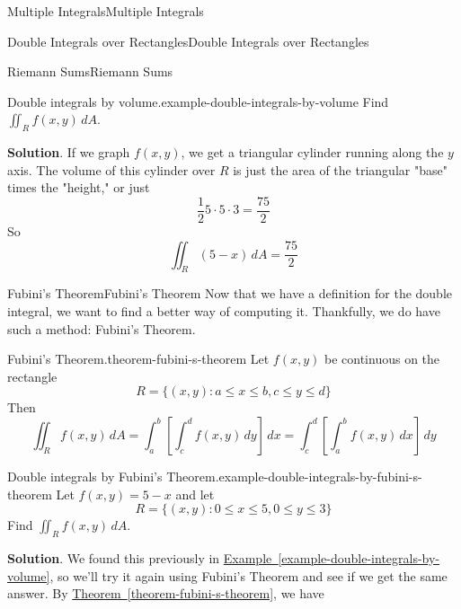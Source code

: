 \documentclass[10pt,]{book}
\numberwithin{equation}{section}
\begin{document}
\begin{chapterptx}{Multiple Integrals}{}{Multiple Integrals}{}{}
\begin{sectionptx}{Double Integrals over Rectangles}{}{Double Integrals over Rectangles}{}{}
\begin{subsectionptx}{Riemann Sums}{}{Riemann Sums}{}{}
\begin{example}{Double integrals by volume.}{example-double-integrals-by-volume}
Find \(\iint_{R}f(x,y)\,dA\).%
\par\smallskip%
\noindent\textbf{Solution}.\hypertarget{solution-196}{}\quad%
\hypertarget{p-1245}{}%
If we graph \(f(x,y)\), we get a triangular cylinder running along the \(y\) axis. The volume of this cylinder over \(R\) is just the area of the triangular "base" times the "height," or just%
\begin{equation*}
\frac{1}{2}5\cdot5\cdot3 = \frac{75}{2}
\end{equation*}
So%
\begin{equation*}
\iint_{R}(5-x)\,dA = \frac{75}{2}
\end{equation*}
%
\end{example}
\end{subsectionptx}
%
%
\typeout{************************************************}
\typeout{************************************************}
%
\begin{subsectionptx}{Fubini's Theorem}{}{Fubini's Theorem}{}{}\label{subsection-fubini-s-theorem}
\hypertarget{p-1246}{}%
Now that we have a definition for the double integral, we want to find a better way of computing it. Thankfully, we do have such a method: Fubini's Theorem.%
\begin{theorem}{Fubini's Theorem.}{}{theorem-fubini-s-theorem}%
\hypertarget{p-1247}{}%
Let \(f(x,y)\) be continuous on the rectangle%
\begin{equation*}
R = \{(x,y) : a\leq x\leq b, c\leq y\leq d\}
\end{equation*}
Then%
\begin{equation*}
\iint_{R}f(x,y)\,dA = \int_{a}^{b}\left[\int_{c}^{d}f(x,y)\,dy\right]\,dx = \int_{c}^{d}\left[\int_{a}^{b}f(x,y)\,dx\right]\,dy
\end{equation*}
%
\end{theorem}
\begin{example}{Double integrals by Fubini's Theorem.}{example-double-integrals-by-fubini-s-theorem}%
\hypertarget{p-1248}{}%
Let \(f(x,y) = 5 - x\) and let%
\begin{equation*}
R = \{(x,y) : 0\leq x\leq 5, 0\leq y\leq 3\}
\end{equation*}
Find \(\iint_{R}f(x,y)\,dA\).%
\par\smallskip%
\noindent\textbf{Solution}.\hypertarget{solution-197}{}\quad%
\hypertarget{p-1249}{}%
We found this previously in \hyperref[example-double-integrals-by-volume]{Example~\ref{example-double-integrals-by-volume}}, so we'll try it again using Fubini's Theorem and see if we get the same answer. By \hyperref[theorem-fubini-s-theorem]{Theorem~\ref{theorem-fubini-s-theorem}}, we have%

\end{example}
\end{subsectionptx}
\end{sectionptx}
\end{chapterptx}
\end{document}
